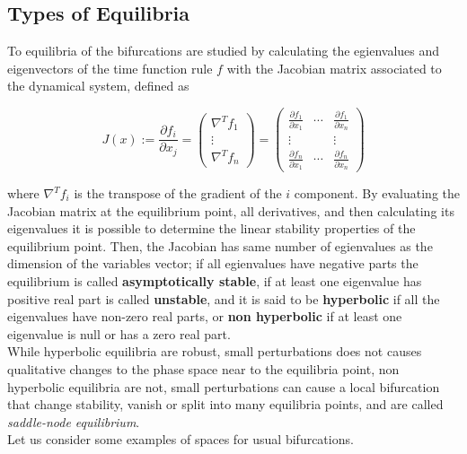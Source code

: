 \subsection{Types of Equilibria}

To equilibria of the bifurcations are studied by calculating the egienvalues and eigenvectors of the time function rule $f$ with the Jacobian matrix associated to the dynamical system, defined as

\begin{equation}\label{Jacobian}
    J(x) :=\frac{\partial f_i}{\partial x_j} = \begin{pmatrix} \nabla^T f_1 \\ \vdots \\ \nabla^T f_n
    \end{pmatrix} =\begin{pmatrix} \frac{\partial f_1}{\partial x_1} & \cdots & \frac{\partial f_1}{\partial x_n}\\
    \vdots & & \vdots \\
    \frac{\partial f_n}{\partial x_1} & \cdots & \frac{\partial f_n}{\partial x_n}\end{pmatrix}
\end{equation}

where $\nabla^T f_i$ is the transpose of the gradient of the $i$ component. By evaluating the Jacobian matrix at the equilibrium point, all derivatives, and then calculating its eigenvalues it is possible to determine the linear stability properties of the equilibrium point. Then, the Jacobian has same number of egienvalues as the dimension of the variables vector; if all egienvalues have negative parts the equilibrium is called \textbf{asymptotically stable}, if at least one eigenvalue has positive real part is called \textbf{unstable}, and it is said to be \textbf{hyperbolic} if all the eigenvalues have non-zero real parts, or \textbf{non hyperbolic} if at least one eigenvalue is null or has a zero real part. \\

While hyperbolic equilibria are robust, small perturbations does not causes qualitative changes to the phase space near to the equilibria point, non hyperbolic equilibria are not, small perturbations can cause a local bifurcation that change stability, vanish or split into many equilibria points, and are called \textit{saddle-node equilibrium}.\\

Let us consider some examples of spaces for usual bifurcations.


